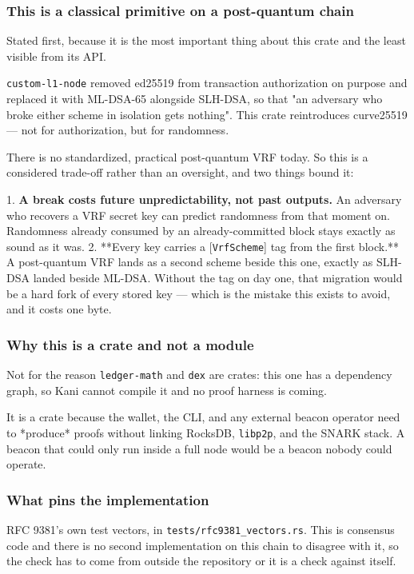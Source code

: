 \documentclass[11pt,a4paper]{article}
\begin{document}
\subsubsection{This is a classical primitive on a post-quantum chain}

Stated first, because it is the most important thing about this crate and
the least visible from its API.

\texttt{custom-l1-node} removed ed25519 from transaction authorization on purpose
and replaced it with ML-DSA-65 alongside SLH-DSA, so that "an adversary who
broke either scheme in isolation gets nothing". This crate reintroduces
curve25519 — not for authorization, but for randomness.

There is no standardized, practical post-quantum VRF today. So this is a
considered trade-off rather than an oversight, and two things bound it:

1. \textbf{A break costs future unpredictability, not past outputs.} An adversary
   who recovers a VRF secret key can predict randomness from that moment on.
   Randomness already consumed by an already-committed block stays exactly
   as sound as it was.
2. **Every key carries a [\texttt{VrfScheme}] tag from the first block.** A
   post-quantum VRF lands as a second scheme beside this one, exactly as
   SLH-DSA landed beside ML-DSA. Without the tag on day one, that migration
   would be a hard fork of every stored key — which is the mistake this
   exists to avoid, and it costs one byte.

\subsubsection{Why this is a crate and not a module}

Not for the reason \texttt{ledger-math} and \texttt{dex} are crates: this one has a
dependency graph, so Kani cannot compile it and no proof harness is coming.

It is a crate because the wallet, the CLI, and any external beacon operator
need to *produce* proofs without linking RocksDB, \texttt{libp2p}, and the SNARK
stack. A beacon that could only run inside a full node would be a beacon
nobody could operate.

\subsubsection{What pins the implementation}

RFC 9381's own test vectors, in \texttt{tests/rfc9381\_vectors.rs}. This is
consensus code and there is no second implementation on this chain to
disagree with it, so the check has to come from outside the repository or it
is a check against itself.
\end{document}
